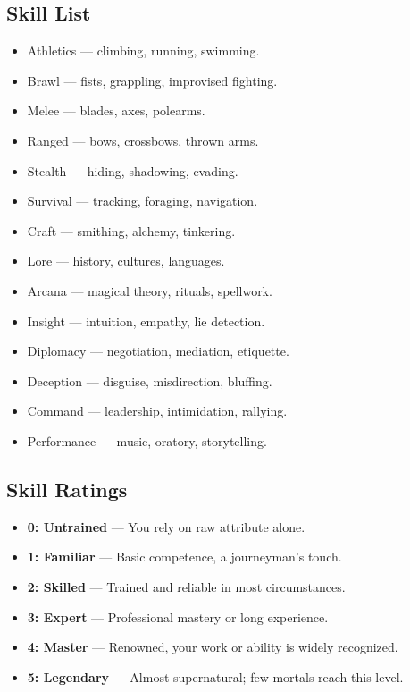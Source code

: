 \documentclass[12pt]{article}
\begin{document}
\subsection*{Skill List}
\begin{multicols}{2}
\begin{itemize}
  \item Athletics — climbing, running, swimming.
  \item Brawl — fists, grappling, improvised fighting.
  \item Melee — blades, axes, polearms.
  \item Ranged — bows, crossbows, thrown arms.
  \item Stealth — hiding, shadowing, evading.
  \item Survival — tracking, foraging, navigation.
  \item Craft — smithing, alchemy, tinkering.
  \item Lore — history, cultures, languages.
  \item Arcana — magical theory, rituals, spellwork.
  \item Insight — intuition, empathy, lie detection.
  \item Diplomacy — negotiation, mediation, etiquette.
  \item Deception — disguise, misdirection, bluffing.
  \item Command — leadership, intimidation, rallying.
  \item Performance — music, oratory, storytelling.
\end{itemize}
\end{multicols}

\subsection*{Skill Ratings}
\begin{itemize}
  \item \textbf{0: Untrained} — You rely on raw attribute alone.  
  \item \textbf{1: Familiar} — Basic competence, a journeyman’s touch.  
  \item \textbf{2: Skilled} — Trained and reliable in most circumstances.  
  \item \textbf{3: Expert} — Professional mastery or long experience.  
  \item \textbf{4: Master} — Renowned, your work or ability is widely recognized.  
  \item \textbf{5: Legendary} — Almost supernatural; few mortals reach this level.  
\end{itemize}
\end{document}
